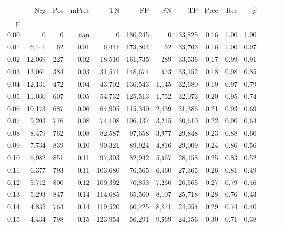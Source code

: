 \begin{tabular}{rrrrrrrrrrrrrr}
\toprule
{} &     Neg &  Pos & mPrec &       TN &       FP &      FN &      TP &  Prec &   Rec & $\hat{p}$ \\
p    &         &      &       &          &          &         &         &       &       &           \\
\midrule
0.00 &       0 &    0 &   nan &        0 &  180,245 &       0 &  33,825 &  0.16 &  1.00 &      1.00 \\
0.01 &   6,441 &   62 &  0.01 &    6,441 &  173,804 &      62 &  33,763 &  0.16 &  1.00 &      0.97 \\
0.02 &  12,069 &  227 &  0.02 &   18,510 &  161,735 &     289 &  33,536 &  0.17 &  0.99 &      0.91 \\
0.03 &  13,061 &  384 &  0.03 &   31,571 &  148,674 &     673 &  33,152 &  0.18 &  0.98 &      0.85 \\
0.04 &  12,131 &  472 &  0.04 &   43,702 &  136,543 &   1,145 &  32,680 &  0.19 &  0.97 &      0.79 \\
0.05 &  11,030 &  607 &  0.05 &   54,732 &  125,513 &   1,752 &  32,073 &  0.20 &  0.95 &      0.74 \\
0.06 &  10,173 &  687 &  0.06 &   64,905 &  115,340 &   2,439 &  31,386 &  0.21 &  0.93 &      0.69 \\
0.07 &   9,203 &  776 &  0.08 &   74,108 &  106,137 &   3,215 &  30,610 &  0.22 &  0.90 &      0.64 \\
0.08 &   8,479 &  762 &  0.08 &   82,587 &   97,658 &   3,977 &  29,848 &  0.23 &  0.88 &      0.60 \\
0.09 &   7,734 &  839 &  0.10 &   90,321 &   89,924 &   4,816 &  29,009 &  0.24 &  0.86 &      0.56 \\
0.10 &   6,982 &  851 &  0.11 &   97,303 &   82,942 &   5,667 &  28,158 &  0.25 &  0.83 &      0.52 \\
0.11 &   6,377 &  793 &  0.11 &  103,680 &   76,565 &   6,460 &  27,365 &  0.26 &  0.81 &      0.49 \\
0.12 &   5,712 &  800 &  0.12 &  109,392 &   70,853 &   7,260 &  26,565 &  0.27 &  0.79 &      0.46 \\
0.13 &   5,293 &  847 &  0.14 &  114,685 &   65,560 &   8,107 &  25,718 &  0.28 &  0.76 &      0.43 \\
0.14 &   4,835 &  764 &  0.14 &  119,520 &   60,725 &   8,871 &  24,954 &  0.29 &  0.74 &      0.40 \\
0.15 &   4,434 &  798 &  0.15 &  123,954 &   56,291 &   9,669 &  24,156 &  0.30 &  0.71 &      0.38 \\

\end{tabular}
